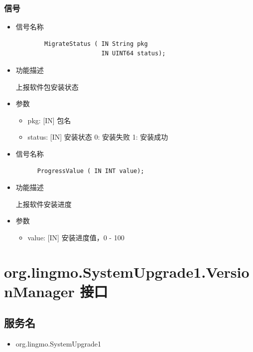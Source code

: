 \documentclass{utart}
\begin{document}
\subsubsection{信号}
\begin{itemize}
    \item 信号名称
    
    \begin{verbatim}
        MigrateStatus ( IN String pkg 
                        IN UINT64 status);
      \end{verbatim}

    \item 功能描述
    
    上报软件包安装状态
    \item 参数
        \begin{itemize}
            \item pkg: [IN] 包名
            \item status: [IN] 安装状态 0: 安装失败 1: 安装成功
        \end{itemize}
\end{itemize}

\begin{itemize}
  \item 信号名称
  
  \begin{verbatim}
      ProgressValue ( IN INT value);
    \end{verbatim}

  \item 功能描述
  
  上报软件安装进度
  \item 参数
      \begin{itemize}
          \item value: [IN] 安装进度值，0 - 100
      \end{itemize}
\end{itemize}

\section{org.lingmo.SystemUpgrade1.VersionManager 接口}
\subsection{服务名}
\begin{itemize}
    \item org.lingmo.SystemUpgrade1
\end{itemize}
\end{document}
